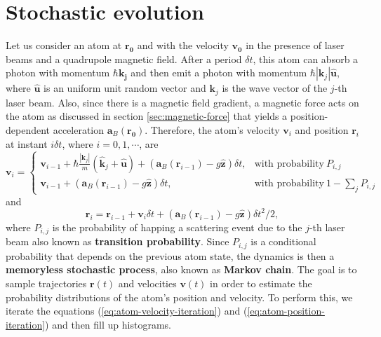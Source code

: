 %
\section{Stochastic evolution}
\label{sec:stochastic-evolution}
%

Let us consider an atom at $ \mathbf{r_0} $ and with the velocity $ \mathbf{v_0} $ in the presence of laser beams and a quadrupole magnetic field. After a period $ \delta t $, this atom can absorb a photon with momentum $ \hbar \mathbf{k_j} $ and then emit a photon with momentum $ \hbar |\mathbf{k}_j| \mathbf{\hat{u}} $, where $ \mathbf{\hat{u}} $ is an uniform unit random vector and $ \mathbf{k}_j $ is the wave vector of the $j$-th laser beam. Also, since there is a magnetic field gradient, a magnetic force acts on the atom as discussed in section \ref{sec:magnetic-force} that yields a position-dependent acceleration $ \mathbf{a}_{B}(\mathbf{r_0}) $. Therefore, the atom's velocity $ \mathbf{v}_i $ and position $ \mathbf{r}_i $ at instant $ i \delta t $, where $ i = 0, 1, \cdots $, are
\begin{equation}
    \mathbf{v}_{i} = \left\{ \begin{array}{lr}
        \mathbf{v}_{i - 1} + \hbar \frac{|\mathbf{k}_j|}{m}(\mathbf{\hat{k}}_j + \mathbf{\hat{u}}) + (\mathbf{a}_B(\mathbf{r}_{i - 1})- g \mathbf{\hat{z}}) \delta t, & \textrm{with probability}\ P_{i,j}
        \\
        \mathbf{v}_{i - 1} + (\mathbf{a}_B(\mathbf{r}_{i - 1})- g \mathbf{\hat{z}}) \delta t, & \textrm{with probability}\ 1 - \sum_{j} P_{i,j}
        \end{array} \right.
        \label{eq:atom-velocity-iteration}
\end{equation}
and
\begin{equation}
    \mathbf{r}_i = \mathbf{r}_{i - 1} + \mathbf{v}_{i}\delta t + (\mathbf{a}_B(\mathbf{r}_{i - 1}) - g \mathbf{\hat{z}}) \delta t^2 / 2,
    \label{eq:atom-position-iteration}
\end{equation}
where $ P_{i,j} $ is the probability of happing a scattering event due to the $ j $-th laser beam also known as \textbf{transition probability}. Since $ P_{i,j} $ is a conditional probability that depends on the previous atom state, the dynamics is then a \textbf{memoryless stochastic process}, also known as \textbf{Markov chain}. The goal is to sample trajectories $ \mathbf{r}(t) $ and velocities $ \mathbf{v}(t) $ in order to estimate the probability distributions of the atom's position and velocity. To perform this, we iterate the equations (\ref{eq:atom-velocity-iteration}) and (\ref{eq:atom-position-iteration}) and then fill up histograms.


